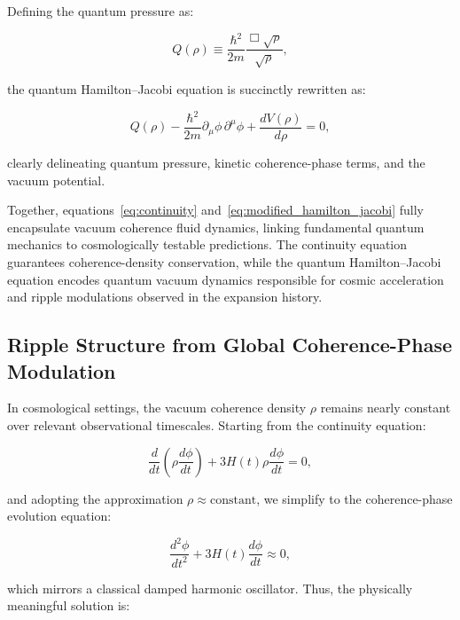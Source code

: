 Defining the quantum pressure as:

\begin{equation}
Q(\rho)\equiv \frac{\hbar^2}{2m}\frac{\Box\sqrt{\rho}}{\sqrt{\rho}},
\label{eq:quantum_pressure}
\end{equation}

the quantum Hamilton–Jacobi equation is succinctly rewritten as:

\begin{equation}
Q(\rho) - \frac{\hbar^2}{2m}\partial_\mu\phi\,\partial^\mu\phi + \frac{dV(\rho)}{d\rho} = 0,
\label{eq:modified_hamilton_jacobi}
\end{equation}

clearly delineating quantum pressure, kinetic coherence-phase terms, and the vacuum potential.

Together, equations~\eqref{eq:continuity} and~\eqref{eq:modified_hamilton_jacobi} fully encapsulate vacuum coherence fluid dynamics, linking fundamental quantum mechanics to cosmologically testable predictions. The continuity equation guarantees coherence-density conservation, while the quantum Hamilton–Jacobi equation encodes quantum vacuum dynamics responsible for cosmic acceleration and ripple modulations observed in the expansion history.

\subsection{Ripple Structure from Global Coherence-Phase Modulation}

In cosmological settings, the vacuum coherence density \(\rho\) remains nearly constant over relevant observational timescales. Starting from the continuity equation:

\begin{equation}
\frac{d}{dt}\left(\rho \frac{d\phi}{dt}\right) + 3H(t)\rho\frac{d\phi}{dt} = 0,
\label{eq:continuity_ripple}
\end{equation}

and adopting the approximation \(\rho \approx \text{constant}\), we simplify to the coherence-phase evolution equation:

\begin{equation}
\frac{d^2\phi}{dt^2}+3H(t)\frac{d\phi}{dt}\approx 0,
\label{eq:phase_evolution_cosmo}
\end{equation}

which mirrors a classical damped harmonic oscillator. Thus, the physically meaningful solution is:

